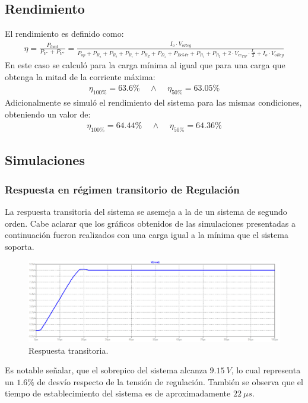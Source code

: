 \subsection{Rendimiento}
El rendimiento es definido como:
\begin{align}
	\eta = \frac{P_{load}}{P_{V^-}+P_{V^+}}=\frac{I_o \cdot V_{oReg}}{P_{op}+P_{R_a}+P_{R_b}+P_{R_c}+P_{R_Z}+P_{D_z}+P_{Bc547}+P_{R_1}+P_{R_2}+2\cdot V_{ce_{TIP}}\cdot \frac{I_o}{2}+I_o \cdot V_{oReg} }
\end{align}
En este caso se calculó para la carga mínima al igual que para una carga que obtenga la mitad de la corriente máxima:
\begin{align}
	\eta_{100\%}  =63.6\%\ \ \ \ \ \wedge  \ \ \ \ \ 
	\eta_{50\%} = 63.05\%
\end{align}
Adicionalmente se simuló el rendimiento del sistema para las mismas condiciones, obteniendo un valor de:
\begin{align}
\eta_{100\%}= 64.44\% \ \ \ \ \ \wedge  \ \ \ \ \ \eta_{50\%}=64.36\%
\end{align}
\subsection{Simulaciones}

\subsubsection{Respuesta en régimen transitorio de Regulación}
La respuesta transitoria del sistema se asemeja a la de un sistema de segundo orden. Cabe aclarar que los gráficos obtenidos de las simulaciones presentadas a continuación fueron realizados con una carga igual a la mínima que el sistema soporta.
\begin{figure}[H]
\centering
	\includegraphics[width=1\textwidth]{ImagenesEjercicio2/transresp.png}
	\caption{Respuesta transitoria.}
	\label{fig:transitorioFuente}
\end{figure}

Es notable señalar, que el sobrepico del sistema alcanza $9.15 \ V$, lo cual representa un $1.6\%$ de desvío respecto de la tensión de regulación. También se observa que el tiempo de establecimiento del sistema es de aproximadamente $22 \ \mu s$.

